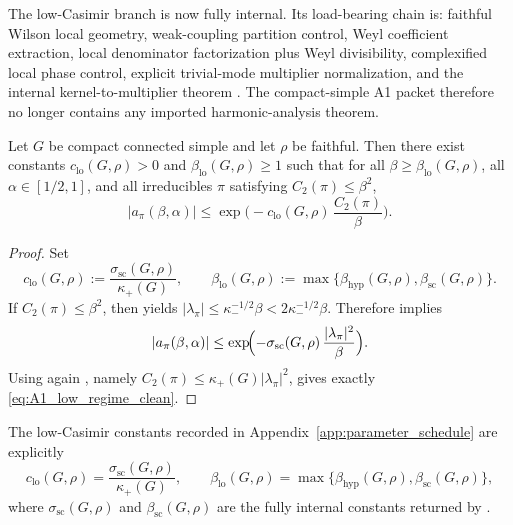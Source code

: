 \begin{remark}\label{rem:A1_low_regime_status_after_gateA}
The low-Casimir branch is now fully internal.
Its load-bearing chain is:
faithful Wilson local geometry,
weak-coupling partition control,
Weyl coefficient extraction,
local denominator factorization plus Weyl divisibility,
complexified local phase control,
explicit trivial-mode multiplier normalization,
and the internal kernel-to-multiplier theorem
.
The compact-simple A1 packet therefore no longer contains any imported harmonic-analysis theorem.
\end{remark}

\begin{theorem}\label{thm:A1_low_regime_background}
Let $G$ be compact connected simple and let $\rho$ be faithful.
Then there exist constants $c_{\mathrm{lo}}(G,\rho)>0$ and $\beta_{\mathrm{lo}}(G,\rho)\ge 1$ such that for all $\beta\ge \beta_{\mathrm{lo}}(G,\rho)$, all $\alpha\in[1/2,1]$, and all irreducibles $\pi$ satisfying $C_2(\pi)\le \beta^2$,
\begin{equation}\label{eq:A1_low_regime_clean}
|a_\pi(\beta,\alpha)|
\le
\exp\!\Big(-c_{\mathrm{lo}}(G,\rho)\,\frac{C_2(\pi)}{\beta}\Big).
\end{equation}
\end{theorem}

\begin{proof}
Set
\[
c_{\mathrm{lo}}(G,\rho):=\frac{\sigma_{\mathrm{sc}}(G,\rho)}{\kappa_+(G)},
\qquad
\beta_{\mathrm{lo}}(G,\rho):=\max\{\beta_{\mathrm{hyp}}(G,\rho),\beta_{\mathrm{sc}}(G,\rho)\}.
\]
If $C_2(\pi)\le \beta^2$, then  yields
$|\lambda_\pi|\le \kappa_-^{-1/2}\beta < 2\kappa_-^{-1/2}\beta$.
Therefore  implies
\[
|a_\pi(\beta,\alpha)|
\le
\exp\!\Bigl(-\sigma_{\mathrm{sc}}(G,\rho)\,\frac{|\lambda_\pi|^2}{\beta}\Bigr).
\]
Using again , namely $C_2(\pi)\le \kappa_+(G)|\lambda_\pi|^2$, gives exactly \eqref{eq:A1_low_regime_clean}.
\end{proof}

\begin{corollary}\label{cor:A1_low_regime_ledger_constants}
The low-Casimir constants recorded in Appendix~\ref{app:parameter_schedule} are explicitly
\[
c_{\mathrm{lo}}(G,\rho)=\frac{\sigma_{\mathrm{sc}}(G,\rho)}{\kappa_+(G)},
\qquad
\beta_{\mathrm{lo}}(G,\rho)=\max\{\beta_{\mathrm{hyp}}(G,\rho),\beta_{\mathrm{sc}}(G,\rho)\},
\]
where $\sigma_{\mathrm{sc}}(G,\rho)$ and $\beta_{\mathrm{sc}}(G,\rho)$ are the fully internal constants returned by
.
\end{corollary}

